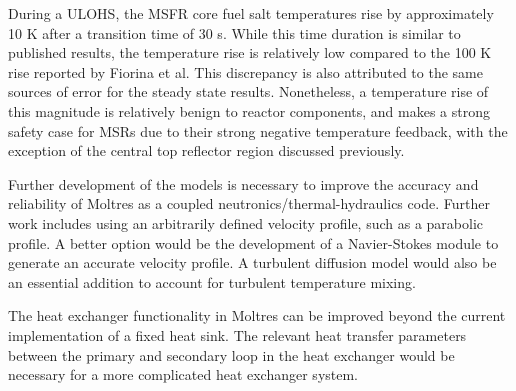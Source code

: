 \documentclass{anstrans}
\begin{document}
	During a \gls{ULOHS}, the \gls{MSFR} core fuel salt temperatures rise by
	approximately 10 K after a transition time of 30 s. While this time
	duration is
	similar to published results, the temperature rise is relatively low
	compared to the 100 K rise reported by Fiorina et al.
	\cite{fiorina_modelling_2014} This discrepancy is also attributed to the
	same sources of error for the steady state results. Nonetheless, a
	temperature rise of
	this magnitude is relatively benign to reactor components, and makes
	a strong safety case for \glspl{MSR} due to their strong negative
	temperature feedback, with the exception of the central top reflector
	region discussed previously.
	
	Further development of the models is necessary to improve the accuracy
	and reliability of Moltres as a coupled neutronics/thermal-hydraulics code.
	Further work includes using an arbitrarily defined velocity profile, such
	as a parabolic profile. A better option would be the development of a
	Navier-Stokes module to generate an accurate velocity profile. A turbulent
	diffusion model would also be an essential addition to account for
	turbulent temperature mixing.
	
	The heat exchanger functionality in Moltres can be improved beyond
	the current implementation of a fixed heat sink. The relevant heat
	transfer parameters between the primary and secondary loop in the heat
	exchanger would be necessary for a more complicated heat exchanger system.



\begin{center}
	
	
\end{center}
\end{document}
